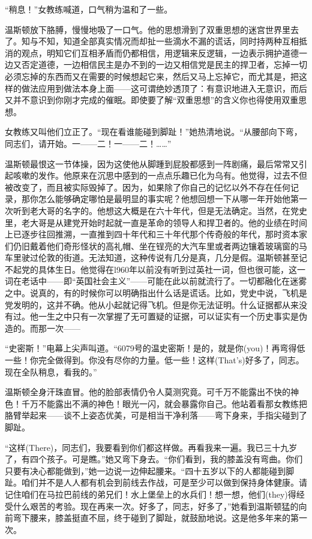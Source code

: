 “稍息！”女教练喊道，口气稍为温和了一些。


温斯顿放下胳膊，慢慢地吸了一口气。他的思想滑到了双重思想的迷宫世界里去了。知与不知，知道全部真实情况而却扯一些滴水不漏的谎话，同时持两种互相抵消的观点，明知它们互相矛盾而仍都相信，用逻辑来反逻辑，一边表示拥护道德一边又否定道德，一边相信民主是办不到的一边又相信党是民主的捍卫者，忘掉一切必须忘掉的东西而又在需要的时候想起它来，然后又马上忘掉它，而尤其是，把这样的做法应用到做法本身上面——这可谓绝妙透顶了：有意识地进入无意识，而后又并不意识到你刚才完成的催眠。即使要了解“双重思想”的含义你也得使用双重思想。


女教练又叫他们立正了。“现在看谁能碰到脚趾！”她热清地说。“从腰部向下弯，同志们，请开始。一——二！一——二！……”


温斯顿最恨这一节体操，因为这使他从脚踵到屁股都感到一阵剧痛，最后常常又引起咳嗽的发作。他原来在沉思中感到的一点点乐趣已化为乌有。他觉得，过去不但被改变了，而且被实际毁掉了。因为，如果除了你自己的记忆以外不存在任何记录，那你怎么能够确定哪怕是最明显的事实呢？他想回想一下从哪一年开始他第一次听到老大哥的名字的。他想这大概是在六十年代，但是无法确定。当然，在党史里，老大哥是从建党开始时起就一直是革命的领导人和捍卫者的。他的业绩在时间上已逐步往回推溯，一直推到四十年代和三十年代那个传奇般的年代，那时资本家们仍旧戴着他们奇形怪状的高礼帽、坐在锃亮的大汽车里或者两边镶着玻璃窗的马车里驶过伦敦的街道。无法知道，这种传说有几分是真，几分是假。温斯顿甚至记不起党的具体生日。他觉得在l960年以前没有听到过英社一词，但也很可能，这一词在老话中——即“英国社会主义”——可能在此以前就流行了。一切都融化在迷雾之中。说真的，有的时候你可以明确指出什么话是谎话。比如，党史中说，飞机是党发明的，这并不确。他从小起就记得飞机。但是你无法证明。什么证据都从来没有过。他一生之中只有一次掌握了无可置疑的证据，可以证实有一个历史事实是伪造的。而那一次——


“史密斯！”电幕上尖声叫道。“6079号的温史密斯！是的，就是你(you)！再弯得低一些！你完全做得到。你没有尽你的力量。低一些！这样(That's)好多了，同志。现在全队稍息，看我的。”


温斯顿全身汗珠直冒。他的脸部表情仍令人莫测究竟。可千万不能露出不快的神色！千万不能露出不满的神色！眼光一闪，就会暴露你自己。他站着看那女教练把胳臂举起来——谈不上姿态优美，可是相当干净利落——弯下身来，手指尖碰到了脚趾。


“这样(There)，同志们，我要看到你们都这样做。再看我来一遍。我已三十九岁了，有四个孩子。可是瞧。”她又弯下身去。“你们看到，我的膝盖没有弯曲。你们只要有决心都能做到，”她一边说一边伸起腰来。“四十五岁以下的人都能碰到脚趾。咱们并不是人人都有机会到前线去作战，可是至少可以做到保持身体健康。请记住咱们在马拉巴前线的弟兄们！水上堡垒上的水兵们！想一想，他们(they)得经受什么艰苦的考验。现在再来一次。好多了，同志，好多了，”她看到温斯顿猛的向前弯下腰来，膝盖挺直不屈，终于碰到了脚趾，就鼓励地说。这是他多年来的第一次。